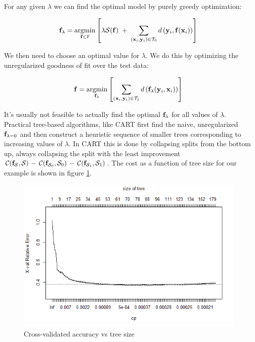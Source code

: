 \documentclass[11pt,openany,american,usenames,dvipsnames,svgnames,x11names,table,isodate]{article}
\numberwithin{equation}{section}
\numberwithin{figure}{section}
\DeclareMathOperator*{\argmin}{argmin}
\begin{document}
For any given $\lambda$ we can find the optimal model by purely greedy
optimization:

\begin{equation}
\f_{\lambda}=\argmin_{\f\in\Fspace}\left[\lambda\cmplxty(\f)\;+\;\sum_{(\x_{i},\y_{i})\in\Tset_{0}}d\left(\y_{i},\f(\x_{i})\right)\right]
\end{equation}


We then need to choose an optimal value for $\lambda$. We do this
by optimizing the unregularized goodness of fit over the test data:

\begin{equation}
\f=\argmin_{\f_{\lambda}}\left[\sum_{(\x_{i},\y_{i})\in\Tset_{1}}d\left(\f_{\lambda}(\y_{i},\x_{i})\right)\right]
\end{equation}


It's usually not feasible to actually find the optimal ${\mathbf f}_{\lambda}$
for all values of $\lambda.$ Practical tree-based algorithms, like
CART first find the naive, unregularized ${\mathbf f}_{\lambda=0}$ and then
construct a heuristic sequence of smaller trees corresponding to increasing
values of $\lambda$. In CART this is done by collapsing splits from
the bottom up, always collapsing the split with the least improvement
$\mathcal{C}({\mathbf f}_{\mathcal{S}},\mathcal{S})\,-\,\mathcal{C}({\mathbf f}_{\mathcal{S}_{0}},\mathcal{S}_{0})\,-\,\mathcal{C}({\mathbf f}_{\mathcal{S}_{1}},\mathcal{S}_{1})$.
The cost as a function of tree size for our example is shown in figure
\ref{fig:Cross-validated-accuracy-vs}.

\begin{figure}
\noindent \begin{centering}
\includegraphics[width=12cm]{fig/rpart-unpruned-plotcp}
\par\end{centering}

\protect\caption{\label{fig:Cross-validated-accuracy-vs}Cross-validated accuracy vs
tree size}
\end{figure}
\end{document}
